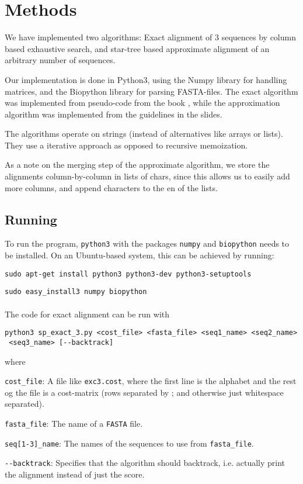 \section{Methods}

We have implemented two algorithms: Exact alignment of 3 sequences by
column based exhaustive search, and star-tree based approximate alignment of an arbitrary number of sequences.

Our implementation is done in Python3, using the Numpy library for
handling matrices, and the Biopython library for parsing FASTA-files.
The exact algorithm was implemented from pseudo-code from the book
\citep{Gusfield}, while the approximation algorithm was implemented
from the guidelines in the slides.

The algorithms operate on strings (instead of alternatives like arrays
or lists). They use a iterative approach as opposed to recursive
memoization.

As a note on the merging step of the approximate algorithm, we store the alignments column-by-column in lists of chars, since this allows us to easily add more columns, and append characters to the en of the lists.

\subsection{Running}

To run the program, \verb|python3| with the packages \verb|numpy| and
\verb|biopython| needs to be installed. On an Ubuntu-based system, this can
be achieved by running:

\verb|sudo apt-get install python3 python3-dev python3-setuptools|

\verb|sudo easy_install3 numpy biopython|

\paragraph{}
The code for exact alignment can be run with

\begin{verbatim}
python3 sp_exact_3.py <cost_file> <fasta_file> <seq1_name> <seq2_name>
 <seq3_name> [--backtrack]
\end{verbatim}

where

\begin{description}
\item{\verb|cost_file|:} A file like \verb|exc3.cost|, where the
  first line is the alphabet and the rest og the file is a cost-matrix
  (rows separated by ; and otherwise just whitespace separated).
\item{\verb|fasta_file|:} The name of a \verb|FASTA| file.
\item{\verb|seq[1-3]_name|:} The names of the sequences to use from
  \verb|fasta_file|.
\item{\verb|--backtrack|:} Specifies that the algorithm should
  backtrack, i.e. actually print the alignment instead of just the
  score.
\end{description}

